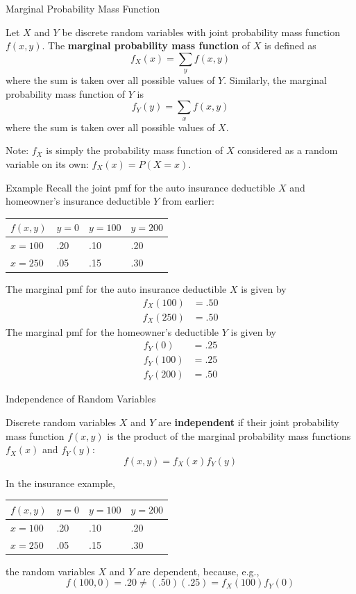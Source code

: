 \documentclass[xcolor=table]{beamer}
\renewcommand{\emph}{\textbf}
\begin{document}
\begin{frame}{Marginal Probability Mass Function}
\begin{block}{}
Let $X$ and $Y$ be discrete random variables with joint probability mass function $f(x,y)$. The \emph{marginal probability mass function} of $X$ is defined as
$$f_X(x) = \sum_y f(x,y)$$
where the sum is taken over all possible values of $Y$. Similarly, the marginal probability mass function of $Y$ is
$$f_Y(y) = \sum_x f(x,y)$$
where the sum is taken over all possible values of $X$.
\end{block}

Note: $f_X$ is simply the probability mass function of $X$ considered as a random variable on its own: $f_X(x) = P(X=x)$.
\end{frame}

\begin{frame}{Example}
Recall the joint pmf for the auto insurance deductible $X$ and homeowner's insurance deductible $Y$ from earlier:
\begin{center}
\begin{tabular}{l||l|l|l}
$f(x,y)$ & $y=0$ & $y=100$ & $y=200$ \\ \hline \hline
$x=100$ & .20 & .10 & .20 \\ \hline
$x=250$ & .05 & .15 & .30
\end{tabular}
\end{center}
\pause The marginal pmf for the auto insurance deductible $X$ is given by
\begin{align*}
f_X(100) &= .50 \\
f_X(250) &= .50
\end{align*}
\pause The marginal pmf for the homeowner's deductible $Y$ is given by
\begin{align*}
f_Y(0) &= .25 \\
f_Y(100) &= .25 \\
f_Y(200) &= .50
\end{align*}
\end{frame}

\begin{frame}{Independence of Random Variables}
\begin{block}{}
Discrete random variables $X$ and $Y$ are \emph{independent} if their joint probability mass function $f(x,y)$ is the product of the marginal probability mass functions $f_X(x)$ and $f_Y(y)$:
$$f(x,y) = f_X(x)f_Y(y)$$
\end{block}

In the insurance example,
\begin{center}
\begin{tabular}{l||l|l|l}
$f(x,y)$ & $y=0$ & $y=100$ & $y=200$ \\ \hline \hline
$x=100$ & .20 & .10 & .20 \\ \hline
$x=250$ & .05 & .15 & .30
\end{tabular}
\end{center}
the random variables $X$ and $Y$ are dependent, because, e.g.,
$$f(100,0) = .20 \neq (.50)(.25) = f_X(100)f_Y(0)$$
\end{frame}
\end{document}
